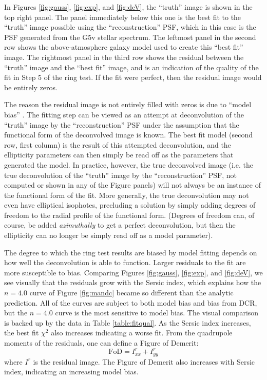\documentclass[apj]{emulateapj}
\begin{document}
In Figures \ref{fig:gauss}, \ref{fig:exp}, and \ref{fig:deV}, the
``truth'' image is shown in the top right panel.  The panel
immediately below this one is the best fit to the ``truth'' image
possible using the ``reconstruction'' PSF, which in this case is the
PSF generated from the G5v stellar spectrum.  The leftmost panel in
the second row shows the above-atmosphere galaxy model used to create
this ``best fit'' image.  The rightmost panel in the third row shows
the residual between the ``truth'' image and the ``best fit'' image,
and is an indication of the quality of the fit in Step 5 of the ring
test.  If the fit were perfect, then the residual image would be
entirely zeros.

The reason the residual image is not entirely filled with zeros is due
to ``model bias'' \citep{Melchior2009, Voigt2010, Bernstein2010}.  The
fitting step can be viewed as an attempt at deconvolution of the
``truth'' image by the ``reconstruction'' PSF under the assumption
that the functional form of the deconvolved image is known.  The best
fit model (second row, first column) is the result of this attempted
deconvolution, and the ellipticity parameters can then simply be read
off as the parameters that generated the model.  In practice, however,
the true deconvolved image (i.e. the true deconvolution of the
``truth'' image by the ``reconstruction'' PSF, not computed or shown
in any of the Figure panels) will not always be an instance of the
functional form of the fit.  More generally, the true deconvolution
may not even have elliptical isophotes, precluding a solution by
simply adding degrees of freedom to the radial profile of the
functional form.  (Degrees of freedom can, of course, be added {\it
  azimuthally} to get a perfect deconvolution, but then the
ellipticity can no longer be simply read off as a model parameter).

The degree to which the ring test results are biased by model fitting
depends on how well the deconvolution is able to function.  Larger
residuals to the fit are more susceptible to bias.  Comparing Figures
\ref{fig:gauss}, \ref{fig:exp}, and \ref{fig:deV}, we see visually
that the residuals grow with the Sersic index, which explains how the
$n=4.0$ curve of Figure \ref{fig:mandc} became so different than the
analytic prediction.  All of the curves are subject to both model bias
and bias from DCR, but the $n=4.0$ curve is the most sensitive to
model bias.  The visual comparison is backed up by the data in Table
\ref{table:fitqual}.  As the Sersic index increases, the best fit
$\chi^2$ also increases indicating a worse fit.  From the quadrupole
moments of the residuals, one can define a Figure of Demerit:
\begin{equation}
  \mathrm{FoD} = I^r_{xx} + I^r_{yy}
\end{equation}
where $I^r$ is the residual image.  The Figure of Demerit also
increases with Sersic index, indicating an increasing model bias.
\end{document}
